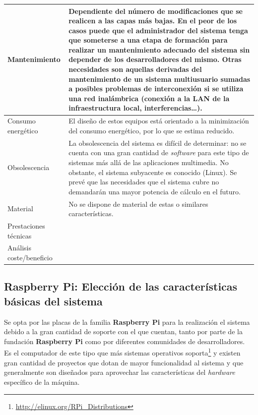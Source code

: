 \begin{table}
\begin{tabular}{|p{2.3cm}|p{12cm}|}
\hline
Mantenimiento&Dependiente del número de modificaciones que se realicen a las capas más bajas. En el peor de los casos puede que el administrador del sistema tenga que someterse a una etapa de formación para realizar un mantenimiento adecuado del sistema sin depender de los desarrolladores del mismo.
 Otras necesidades son aquellas derivadas del mantenimiento de un sistema multiusuario sumadas a posibles problemas de interconexión si se utiliza una red inalámbrica (conexión a la LAN de la infraestructura local, interferencias\dots).\\
\hline
Consumo energético&El diseño de estos equipos está orientado a la minimización del consumo energético, por lo que se estima reducido.\\
\hline
Obsolescencia&La obsolescencia del sistema es difícil de determinar: no se cuenta con una gran cantidad de \textit{software} para este tipo de sistemas más allá de las aplicaciones multimedia. No obstante, el sistema subyacente es conocido (Linux).
Se prevé que las necesidades que el sistema cubre no demandarán una mayor potencia de cálculo en el futuro.\\
\hline
Material&No se dispone de material de estas o similares características.\\
\hline
Prestaciones técnicas&\\
\hline
Análisis coste/beneficio&\\
\hline
\end{tabular}
\end{table}


\subsection{Raspberry Pi: Elección de las características básicas del sistema}

Se opta por las placas de la familia \textbf{Raspberry Pi} para la realización el sistema debido a la gran cantidad de soporte con el que cuentan, tanto por parte de la fundación \textbf{Raspberry Pi} como por diferentes comunidades de desarrolladores. Es el computador de este tipo que más sistemas operativos soporta\footnote{\href{http://elinux.org/RPi_Distributions}{http://elinux.org/RPi\_Distributions}} y existen gran cantidad de proyectos que dotan de mayor funcionalidad al sistema y que generalmente son diseñados para aprovechar las características del \textit{hardware} específico de la máquina.


